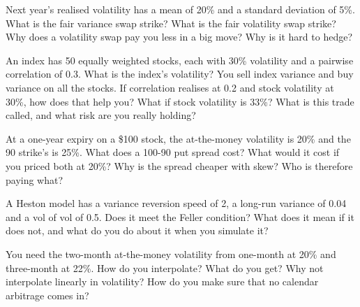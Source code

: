\begin{question}\label{iq:iv2:vol-surface-and-vol-trading:20}
Next year's realised volatility has a mean of 20\% and a standard deviation of 5\%. What is the fair variance swap strike? What is the fair volatility swap strike? Why does a volatility swap pay you less in a big move? Why is it hard to hedge?
\end{question}

\begin{question}\label{iq:iv2:vol-surface-and-vol-trading:21}
An index has 50 equally weighted stocks, each with 30\% volatility and a pairwise correlation of 0.3. What is the index's volatility? You sell index variance and buy variance on all the stocks. If correlation realises at 0.2 and stock volatility at 30\%, how does that help you? What if stock volatility is 33\%? What is this trade called, and what risk are you really holding?
\end{question}

\begin{question}\label{iq:iv2:vol-surface-and-vol-trading:22}
At a one-year expiry on a \$100 stock, the at-the-money volatility is 20\% and the 90 strike's is 25\%. What does a 100-90 put spread cost? What would it cost if you priced both at 20\%? Why is the spread cheaper with skew? Who is therefore paying what?
\end{question}

\begin{question}\label{iq:iv2:vol-surface-and-vol-trading:23}
A Heston model has a variance reversion speed of 2, a long-run variance of 0.04 and a vol of vol of 0.5. Does it meet the Feller condition? What does it mean if it does not, and what do you do about it when you simulate it?
\end{question}

\begin{question}\label{iq:iv2:vol-surface-and-vol-trading:24}
You need the two-month at-the-money volatility from one-month at 20\% and three-month at 22\%. How do you interpolate? What do you get? Why not interpolate linearly in volatility? How do you make sure that no calendar arbitrage comes in?
\end{question}

